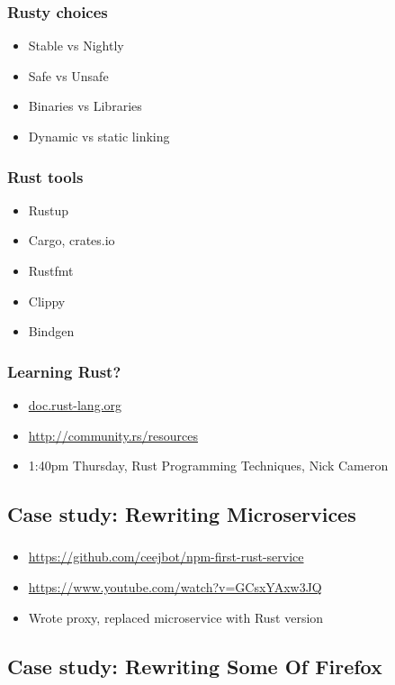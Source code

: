 \documentclass{beamer}
\begin{document}
\begin{frame}[fragile]
\frametitle{Rusty choices}
\begin{itemize}
\item Stable vs Nightly
\item Safe vs Unsafe
\item Binaries vs Libraries
\item Dynamic vs static linking
\end{itemize}
\end{frame}

\begin{frame}[fragile]
\frametitle{Rust tools}
\begin{itemize}
\item Rustup
\item Cargo, crates.io
\item Rustfmt
\item Clippy
\item Bindgen
\end{itemize}
\end{frame}

\begin{frame}[fragile]
\frametitle{Learning Rust?}
\begin{itemize}
\item \url{doc.rust-lang.org}
\item \url{http://community.rs/resources}
\item 1:40pm Thursday, Rust Programming Techniques, Nick Cameron
\end{itemize}
\end{frame}

\subsection{Case study: Rewriting Microservices}

\begin{frame}[fragile]
\frametitle{\insertsubsectionhead}
\begin{itemize}
\item \url{https://github.com/ceejbot/npm-first-rust-service}
\item \url{https://www.youtube.com/watch?v=GCsxYAxw3JQ}
\item Wrote proxy, replaced microservice with Rust version
\end{itemize}
\end{frame}

\subsection{Case study: Rewriting Some Of Firefox}
\end{document}

